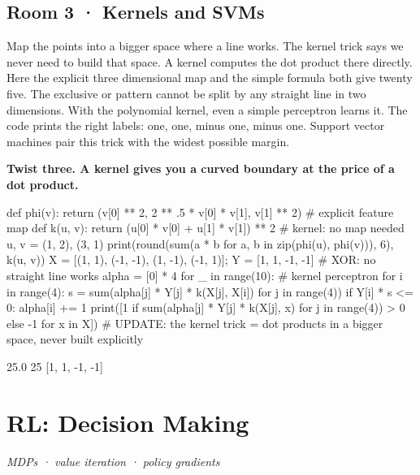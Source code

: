 \documentclass[11pt,a4paper]{report}
\begin{document}
\section*{Room 3 · Kernels and SVMs}
Map the points into a bigger space where a line works. The kernel trick says we never need to build that space. A kernel computes the dot product there directly. Here the explicit three dimensional map and the simple formula both give twenty five. The exclusive or pattern cannot be split by any straight line in two dimensions. With the polynomial kernel, even a simple perceptron learns it. The code prints the right labels: one, one, minus one, minus one. Support vector machines pair this trick with the widest possible margin.
\begin{tcolorbox}[colback=yellow!12,colframe=orange!70!black,boxrule=0.4pt,left=4pt,right=4pt,top=2pt,bottom=2pt]\textbf{Twist three. A kernel gives you a curved boundary at the price of a dot product.}\end{tcolorbox}
\begin{Code}
def phi(v): return (v[0] ** 2, 2 ** .5 * v[0] * v[1], v[1] ** 2)   # explicit feature map
def k(u, v): return (u[0] * v[0] + u[1] * v[1]) ** 2              # kernel: no map needed
u, v = (1, 2), (3, 1)
print(round(sum(a * b for a, b in zip(phi(u), phi(v))), 6), k(u, v))
X = [(1, 1), (-1, -1), (1, -1), (-1, 1)]; Y = [1, 1, -1, -1]       # XOR: no straight line works
alpha = [0] * 4
for _ in range(10):                         # kernel perceptron
    for i in range(4):
        s = sum(alpha[j] * Y[j] * k(X[j], X[i]) for j in range(4))
        if Y[i] * s <= 0: alpha[i] += 1
print([1 if sum(alpha[j] * Y[j] * k(X[j], x) for j in range(4)) > 0 else -1 for x in X])
# UPDATE: the kernel trick = dot products in a bigger space, never built explicitly
\end{Code}
\begin{Out}
25.0 25
[1, 1, -1, -1]
\end{Out}
\chapter{RL: Decision Making}
\textit{MDPs · value iteration · policy gradients}
\end{document}

